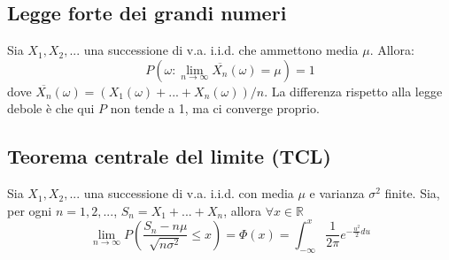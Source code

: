 \documentclass{article}
\begin{document}
	\subsection{Legge forte dei grandi numeri}
	Sia $X_1, X_2, ...$ una successione di v.a. i.i.d. che ammettono media $\mu$. Allora:
	\begin{equation}
		P({\omega : \lim\limits_{n\to\infty} \overline{X_n}(\omega) = \mu}) = 1
	\end{equation}
	dove $\overline{X_n}(\omega) = (X_1(\omega)+...+X_n(\omega))/n$.
	La differenza rispetto alla legge debole è che qui $P$ non tende a 1, ma ci converge proprio.
	
	\newpage
	\subsection{Teorema centrale del limite (TCL)}
	Sia $X_1, X_2, ...$ una successione di v.a. i.i.d. con media $\mu$ e varianza $\sigma^2$ finite. Sia, per ogni $n=1,2,...$, $S_n = X_1+...+X_n$, allora $\forall x\in\mathbb{R}$
	\begin{equation}
		\lim\limits_{n\to\infty} P\left(\frac{S_n-n\mu}{\sqrt{n\sigma^2}} \leq x\right) = \Phi(x) = \int_{-\infty}^{x} \frac{1}{2\pi}e^{-\frac{u^2}{2} du}
	\end{equation}
\end{document}
